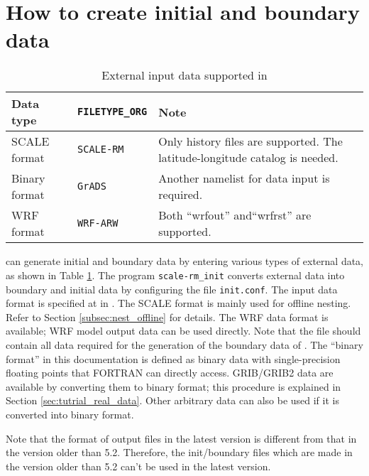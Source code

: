 \section{How to create initial and boundary data} \label{sec:adv_datainput}

\begin{table}[tbh]
\begin{center}
\caption{External input data supported in \scalelib}
\begin{tabularx}{150mm}{l|l|X} \hline
 \rowcolor[gray]{0.9} Data type   & \verb|FILETYPE_ORG|  & Note \\ \hline
 SCALE format   & \verb|SCALE-RM|     & Only history files are supported. The latitude-longitude catalog is needed. \\ \hline
 Binary format  & \verb|GrADS|        & Another namelist for data input is required.    \\ \hline
 WRF format     & \verb|WRF-ARW|      & Both ``wrfout''  and``wrfrst'' are supported.\\ \hline
\end{tabularx}
\label{tab:inputdata_format}
\end{center}
\end{table}

\scalerm can generate initial and boundary data by entering various types of external data, as shown in Table \ref{tab:inputdata_format}. The program \verb|scale-rm_init| converts external data into boundary and initial data by configuring the file \verb|init.conf|. The input data format is specified at  in . The SCALE format is mainly used for offline nesting. Refer to Section \ref{subsec:nest_offline} for details. The WRF data format is available; WRF model output data can be used directly. Note that the file should contain all data required for the generation of the boundary data of \scalerm. The ``binary format'' in this documentation is defined as binary data with single-precision floating points that FORTRAN can directly access. GRIB/GRIB2 data are available by converting them to binary format; this procedure is explained in Section \ref{sec:tutrial_real_data}. Other arbitrary data can also be used if it is converted into binary format.

Note that the format of output files in the latest version is different from that in the version older than 5.2.
Therefore, the init/boundary files which are made in the version older than 5.2 can't be used in the latest version.

